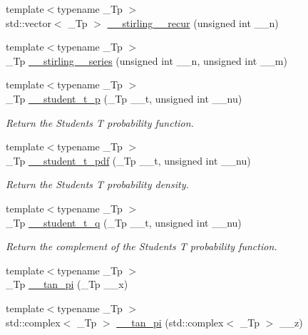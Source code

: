 \begin{DoxyCompactItemize}
\item 
{\footnotesize template$<$typename \+\_\+\+Tp $>$ }\\std\+::vector$<$ \+\_\+\+Tp $>$ \hyperlink{namespacestd_1_1____detail_aa7c6f36dc1f75cd38af10ca232e62f06}{\+\_\+\+\_\+stirling\+\_\+\_\+recur} (unsigned int \+\_\+\+\_\+n)
\item 
{\footnotesize template$<$typename \+\_\+\+Tp $>$ }\\\+\_\+\+Tp \hyperlink{namespacestd_1_1____detail_a8408f17699eb43a14447c7e4795b277f}{\+\_\+\+\_\+stirling\+\_\+\_\+series} (unsigned int \+\_\+\+\_\+n, unsigned int \+\_\+\+\_\+m)
\item 
{\footnotesize template$<$typename \+\_\+\+Tp $>$ }\\\+\_\+\+Tp \hyperlink{namespacestd_1_1____detail_ab9bb02e26c61e3d9dda4738ed4174338}{\+\_\+\+\_\+student\+\_\+t\+\_\+p} (\+\_\+\+Tp \+\_\+\+\_\+t, unsigned int \+\_\+\+\_\+nu)
\begin{DoxyCompactList}\small\item\em Return the Students T probability function. \end{DoxyCompactList}\item 
{\footnotesize template$<$typename \+\_\+\+Tp $>$ }\\\+\_\+\+Tp \hyperlink{namespacestd_1_1____detail_a866bf8f03fd2d5de5024837727beecd8}{\+\_\+\+\_\+student\+\_\+t\+\_\+pdf} (\+\_\+\+Tp \+\_\+\+\_\+t, unsigned int \+\_\+\+\_\+nu)
\begin{DoxyCompactList}\small\item\em Return the Students T probability density. \end{DoxyCompactList}\item 
{\footnotesize template$<$typename \+\_\+\+Tp $>$ }\\\+\_\+\+Tp \hyperlink{namespacestd_1_1____detail_aa430c479c2f41513393d7cb946d260c3}{\+\_\+\+\_\+student\+\_\+t\+\_\+q} (\+\_\+\+Tp \+\_\+\+\_\+t, unsigned int \+\_\+\+\_\+nu)
\begin{DoxyCompactList}\small\item\em Return the complement of the Students T probability function. \end{DoxyCompactList}\item 
{\footnotesize template$<$typename \+\_\+\+Tp $>$ }\\\+\_\+\+Tp \hyperlink{namespacestd_1_1____detail_a72fd3b7fcf9f49ade9411d782e8dbe4e}{\+\_\+\+\_\+tan\+\_\+pi} (\+\_\+\+Tp \+\_\+\+\_\+x)
\item 
{\footnotesize template$<$typename \+\_\+\+Tp $>$ }\\std\+::complex$<$ \+\_\+\+Tp $>$ \hyperlink{namespacestd_1_1____detail_ae19d579db4245c9c4e53a70a0513bb00}{\+\_\+\+\_\+tan\+\_\+pi} (std\+::complex$<$ \+\_\+\+Tp $>$ \+\_\+\+\_\+z)

\end{DoxyCompactItemize}
